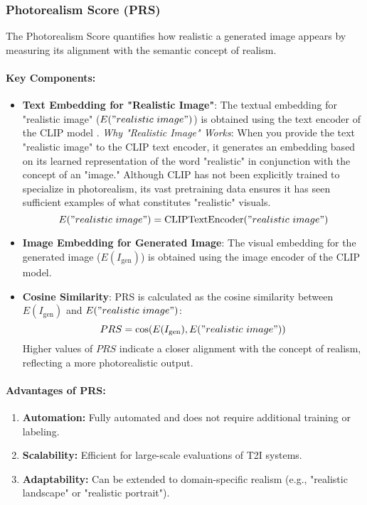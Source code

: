\subsubsection{Photorealism Score (PRS)}
The Photorealism Score quantifies how realistic a generated image appears by measuring its alignment with the semantic concept of realism.

\paragraph{Key Components:}
\begin{itemize}
    \item \textbf{Text Embedding for "Realistic Image"}:
    The textual embedding for "realistic image" (\(E("realistic~image")\)) is obtained using the text encoder of the CLIP model \cite{radford2021learning}. \emph{Why "Realistic Image" Works}: When you provide the text "realistic image" to the CLIP text encoder, it generates an embedding based on its learned representation of the word "realistic" in conjunction with the concept of an "image." Although CLIP has not been explicitly trained to specialize in photorealism, its vast pretraining data ensures it has seen sufficient examples of what constitutes "realistic" visuals.
    \[
    E("realistic~image") = \text{CLIPTextEncoder}("realistic~image")
    \]

    \item \textbf{Image Embedding for Generated Image}:
    The visual embedding for the generated image (\(E(I_{\text{gen}})\)) is obtained using the image encoder of the CLIP model.

    \item \textbf{Cosine Similarity}:
    PRS is calculated as the cosine similarity between \(E(I_{\text{gen}})\) and \(E("realistic~image")\):
    \[
    PRS = \cos(E(I_{\text{gen}}), E("realistic~image"))
    \]
    Higher values of \(PRS\) indicate a closer alignment with the concept of realism, reflecting a more photorealistic output.
\end{itemize}

\paragraph{Advantages of PRS:}
\begin{enumerate}
    \item \textbf{Automation:} Fully automated and does not require additional training or labeling.
    \item \textbf{Scalability:} Efficient for large-scale evaluations of T2I systems.
    \item \textbf{Adaptability:} Can be extended to domain-specific realism (e.g., "realistic landscape" or "realistic portrait").
\end{enumerate}

